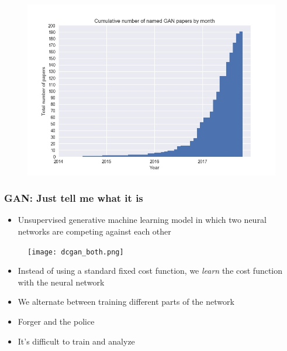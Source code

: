 \documentclass{Bredelebeamer}
\begin{document}

\begin{frame}
\begin{figure}[h!]
	\centering
	\includegraphics[width=\textwidth]{gan_timeline.jpg}
\end{figure}

\end{frame}


\begin{frame}
	\frametitle{GAN: Just tell me what it is}
	\begin{itemize}
		\item Unsupervised generative machine learning model in which two neural networks are competing against each other
	\end{itemize}
\begin{figure}[h!]
	\centering
	\texttt{[image: dcgan\_both.png]}
\end{figure}
	\pause
	\begin{itemize}[<+->]
		\item Instead of using a standard fixed cost function, we \textit{learn} the cost function with the neural network
		\item We alternate between training different parts of the network
		\item Forger and the police
		\item It's difficult to train and analyze
	\end{itemize}
\end{frame}
\end{document}
